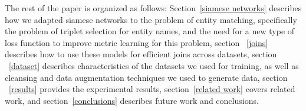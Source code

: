 The rest of the paper is organized as follows: Section~\ref{siamese networks} describes how we adapted siamese networks to the problem of entity matching, specifically the problem of triplet selection for entity names, and the need for a new type of loss function to improve metric learning for this problem, section ~\ref{joins} describes how to use these models for efficient joins across datasets, section ~\ref{dataset} describes characteristics of the datasets we used for training, as well as cleansing and data augmentation techniques we used to generate data, section ~\ref{results} provides the experimental results, section~\ref{related work} covers related work, and section~\ref{conclusions} describes future work and conclusions.
